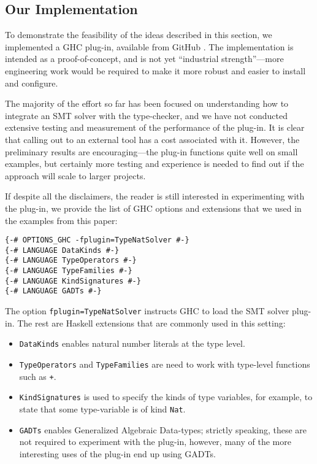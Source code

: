 \documentclass{sigplanconf}
\begin{document}
\subsection{Our Implementation}
\label{implementation}

To demonstrate the feasibility of the ideas described in this section,
we implemented a GHC plug-in, available from GitHub \cite{type-nats-solver}.
The implementation is intended as a proof-of-concept, and is not
yet ``industrial strength''---more engineering work would be required
to make it more robust and easier to install and configure.

The majority of the effort so far has been focused on understanding how
to integrate an SMT solver with the type-checker, and we have not
conducted extensive testing and measurement of the performance of the plug-in.
It is clear that calling out to an external tool has a cost associated
with it.  However, the preliminary results are encouraging---the plug-in
functions quite well on small examples, but certainly more testing and
experience is needed to find out if the approach will scale to larger
projects.

If despite all the disclaimers, the reader is still interested in
experimenting with the plug-in, we provide the list of GHC options and
extensions that we used in the examples from this paper:

\begin{Verbatim}
{-# OPTIONS_GHC -fplugin=TypeNatSolver #-}
{-# LANGUAGE DataKinds #-}
{-# LANGUAGE TypeOperators #-}
{-# LANGUAGE TypeFamilies #-}
{-# LANGUAGE KindSignatures #-}
{-# LANGUAGE GADTs #-}
\end{Verbatim}

The option \Verb"fplugin=TypeNatSolver" instructs GHC to load the SMT solver
plug-in.  The rest are Haskell extensions that are commonly used in this
setting:
\begin{itemize}
\item \Verb"DataKinds" enables natural number literals at the type
level.
\item \Verb"TypeOperators" and \Verb"TypeFamilies" are need to work
with type-level functions such as \Verb"+".
\item \Verb"KindSignatures" is used to specify the kinds of type variables,
for example, to state that some type-variable is of kind \Verb"Nat".
\item \Verb"GADTs" enables Generalized Algebraic Data-types;  strictly
speaking, these are not required to experiment with the plug-in, however,
many of the more interesting uses of the plug-in end up using GADTs.
\end{itemize}
\end{document}
